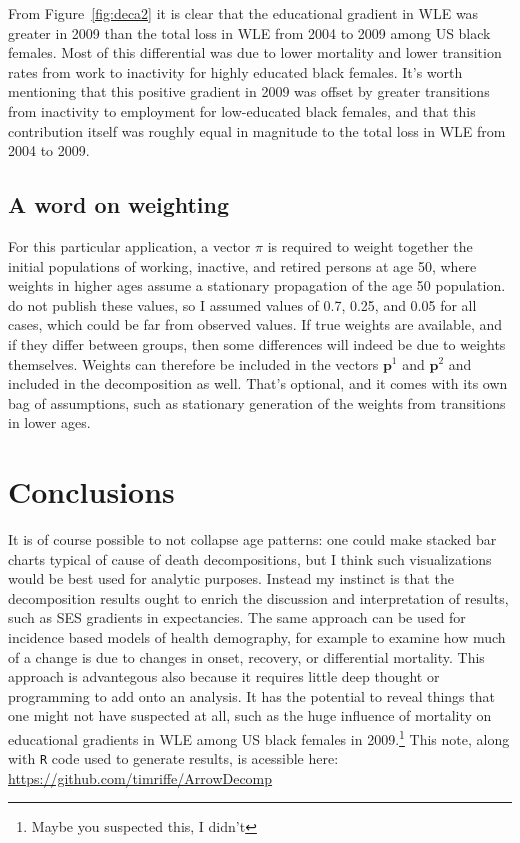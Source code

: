 \documentclass{article}
\begin{document}
From Figure~\ref{fig:deca2} it is clear that the educational gradient in WLE was
greater in 2009 than the total loss in WLE from 2004 to 2009 among US black
females. Most of this differential was due to lower mortality and lower
transition rates from work to inactivity for highly educated black females. It's
worth mentioning that this positive gradient in 2009 was offset by greater
transitions from inactivity to employment for low-educated black females, and
that this contribution itself was roughly equal in magnitude to the total loss
in WLE from 2004 to 2009.
\FloatBarrier

\subsection{A word on weighting}
For this particular application, a vector $\pi$ is required to weight together
the initial populations of working, inactive, and retired persons at age 50,
where weights in higher ages assume a stationary propagation of the age 50
population.
\citet{Dudel2017} do not publish these values, so I assumed values of 0.7,
0.25, and 0.05 for all cases, which could be far from observed values. If true
weights are available, and if they differ between groups, then some differences
will indeed be due to weights themselves. Weights can therefore be included in
the vectors $\textbf{p}^1$ and $\textbf{p}^2$ and included in the decomposition
as well. That's optional, and it comes with its own bag of assumptions, such as
stationary generation of the weights from transitions in lower ages.

\section{Conclusions}
It is of course possible to not collapse age patterns: one could make stacked
bar charts typical of cause of death decompositions, but I think such
visualizations would be best used for analytic purposes. Instead my instinct is
that the decomposition results ought to enrich the discussion and interpretation
of results, such as SES gradients in expectancies. The same approach can be used
for incidence based models of health demography, for example to examine how much
of a change is due to changes in onset, recovery, or differential mortality.
This approach is advantegous also because it requires little deep thought or
programming to add onto an analysis. It has the potential to reveal things that
one might not have suspected at all, such as the huge influence of mortality on
educational gradients in WLE among US black females in 2009.\footnote{Maybe you
suspected this, I didn't} This note, along with \texttt{R} code used to generate
results, is acessible here:\\ \url{https://github.com/timriffe/ArrowDecomp}


\singlespacing

   
\end{document}
